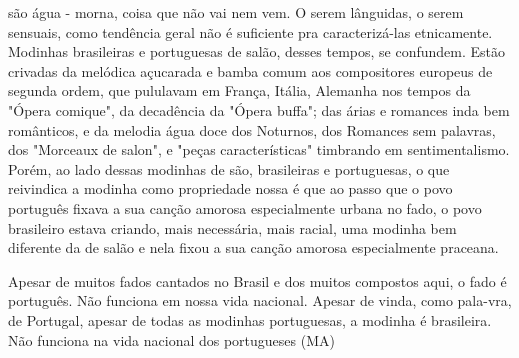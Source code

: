 são água - morna, coisa que não vai nem vem. O serem lânguidas, o serem
sensuais, como tendência geral não é suficiente pra caracterizá-las
etnicamente. Modinhas brasileiras e portuguesas de salão, desses tempos,
se confundem. Estão crivadas da melódica açucarada e bamba comum aos
compositores europeus de segunda ordem, que pululavam em França, Itália,
Alemanha nos tempos da "Ópera comique", da decadência da "Ópera buffa";
das árias e romances inda bem românticos, e da melodia água doce dos
Noturnos, dos Romances sem palavras, dos "Morceaux de salon", e "peças
características" timbrando em sentimentalismo. Porém, ao lado dessas
modinhas de são, brasileiras e portuguesas, o que reivindica a modinha
como propriedade nossa é que ao passo que o povo português fixava a sua
canção amorosa especialmente urbana no fado, o povo brasileiro estava
criando, mais necessária, mais racial, uma modinha bem diferente da de
salão e nela fixou a sua canção amorosa especialmente praceana.

Apesar de muitos fados cantados no Brasil e dos muitos compostos aqui, o
fado é português. Não funciona em nossa vida nacional. Apesar de vinda,
como pala-vra, de Portugal, apesar de todas as modinhas portuguesas, a
modinha é brasileira. Não funciona na vida nacional dos portugueses (MA)

